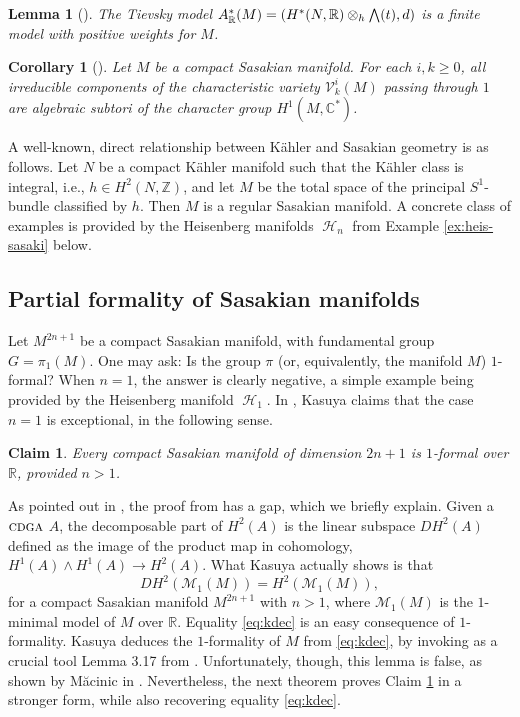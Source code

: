 \documentclass{article}
\numberwithin{equation}{section}
\newtheorem{corollary}[theorem]{Corollary}
\newtheorem{lemma}[theorem]{Lemma}
\newtheorem{claim}[theorem]{Claim}
\theoremstyle{definition}
\newcommand{\Z}{\mathbb{Z}}
\newcommand{\R}{\mathbb{R}}
\renewcommand{\C}{\mathbb{C}}
\newcommand{\VV}{\mathcal{V}}
\newcommand{\M}{\mathcal{M}}
\newcommand{\cdga}{\ensuremath{\textsc{cdga}}}
\DeclareMathOperator{\Heis}{\mathcal{H}}
\newcommand{\bwedge}{\mbox{\normalsize $\bigwedge$}}
\begin{document}
\begin{lemma}[\cite{PS-imrn19}]
\label{lem:qtievsky}
The Tievsky model $A^{*}_{\R}(M)=(H^{*}(N, \R)\otimes _h \bwedge(t), d)$ 
is a finite model with positive weights for $M$. 
\end{lemma} 

\begin{corollary}[\cite{PS-imrn19}]
\label{cor:tmodel}
Let $M$ be a compact Sasakian manifold. 
For each $i, k\ge 0$, all irreducible components 
of the characteristic variety $\VV^i_k(M)$ passing through $1$ 
are algebraic subtori of the character group $H^1(M,\C^*)$.
\end{corollary}

A well-known, direct relationship between K\"{a}hler and Sasakian 
geometry is as follows.  Let $N$ be a compact K\"{a}hler manifold 
such that the K\"ahler class is integral, i.e., $h\in H^2(N,\Z)$, 
and let $M$ be the total space of the principal $S^1$-bundle 
classified by $h$.  Then $M$ is a regular Sasakian 
manifold.  A concrete class of examples is provided by the 
Heisenberg manifolds $\Heis_n$ from Example \ref{ex:heis-sasaki} below.

\subsection{Partial formality of Sasakian manifolds}
\label{subsec:sas1f}
Let $M^{2n+1}$ be a compact Sasakian manifold, 
with fundamental group $G=\pi_1(M)$.  One may ask: 
Is the group $\pi$ (or, equivalently, the manifold $M$) 
$1$-formal?  When $n=1$, the answer is clearly negative, 
a simple example being provided by the Heisenberg manifold 
$\Heis_1$.  In \cite[Theorem 1.1]{Kas17}, Kasuya 
claims that the case $n=1$ is exceptional, in the 
following sense.

\begin{claim}
\label{thm:sas1f}
Every compact Sasakian manifold of dimension $2n+1$ is 
$1$-formal over $\R$, provided $n>1$.
\end{claim}

As pointed out in \cite{PS-imrn19}, the proof from \cite{Kas17} has a gap, 
which we briefly explain. Given a $\cdga$ $A$, the decomposable part
of $H^2(A)$ is the linear subspace $DH^2(A)$ defined as the image of 
the product map in cohomology, $H^1(A)\wedge H^1(A)\to H^2(A)$. 
What Kasuya actually shows is that 
\begin{equation}
\label{eq:kdec}
DH^2(\M_1(M)) = H^2(\M_1(M)),
\end{equation}
for a compact Sasakian manifold $M^{2n+1}$ with $n>1$, 
where $\M_1(M)$ is the $1$-minimal model of $M$ over $\R$.
Equality \eqref{eq:kdec} is an easy consequence of $1$-formality.  
Kasuya deduces the $1$-formality of $M$ from \eqref{eq:kdec}, 
by invoking as a crucial tool Lemma 3.17 from \cite{ABC}.   
Unfortunately, though, this lemma is false, as shown by M\u{a}cinic 
in \cite{Mc10}.   %
Nevertheless, the next theorem proves Claim \ref{thm:sas1f} 
in a stronger form, while also recovering equality \eqref{eq:kdec}.
\end{document}
